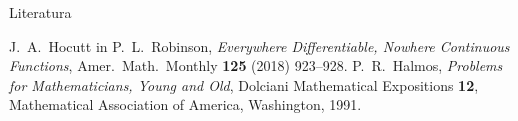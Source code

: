 \documentclass[10]{beamer}
\begin{document}
\begin{frame}{Literatura}
    \begin{thebibliography}{1}
        J.~A.~Hocutt in P.~L.~Robinson, \emph{Everywhere Differentiable, Nowhere Continuous Functions}, Amer.~Math.~Monthly \textbf{125} (2018) 923--928.
        P.~R.~Halmos, \emph{Problems for Mathematicians, Young and Old}, Dolciani Mathematical Expositions \textbf{12}, Mathematical Association of America, Washington, 1991.
    \end{thebibliography}
\end{frame}
\end{document}
